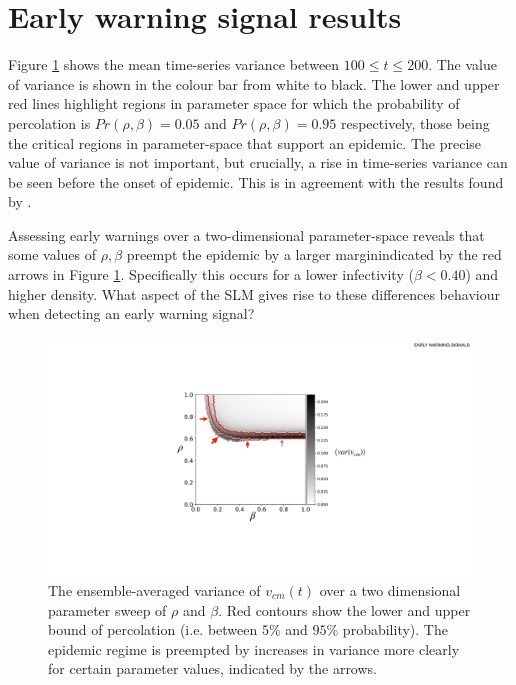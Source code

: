 \section{Early warning signal results}
\label{section:ews_slm}

Figure \ref{fig:ews-results} shows the mean time-series variance between $100\leq t \leq 200$. %
The value of variance is shown in the colour bar from white to black. %
The lower and upper red lines highlight regions in parameter space for which the %
probability of percolation is $Pr(\rho, \beta)=0.05$ and $Pr(\rho, \beta)=0.95$ respectively, %
those being the  critical regions in parameter-space that support an epidemic. %
The precise value of variance is not important, but crucially, a rise in time-series variance %
can be seen before the onset of epidemic. %
This is in agreement with the results found by \cite{OROZCOFUENTES201912}. %

Assessing early warnings over a two-dimensional parameter-space reveals that some values %
of $\rho, \beta$ preempt the epidemic by a larger margin\textemdash indicated by the red %
arrows in Figure \ref{fig:ews-results}. Specifically this occurs for a lower infectivity %
($\beta<0.40$) and higher density. What aspect of the SLM gives rise to these differences %
behaviour when detecting an early warning signal? %

 \begin{figure}
    \centering
    \includegraphics[scale=0.45]{chapter3/figures/figure11.pdf}
    \caption{The ensemble-averaged variance of $v_{cm}(t)$ over a two dimensional parameter sweep of $\rho$ and $\beta$. Red contours show the lower and upper bound of percolation (i.e. between $5\%$ and $95\%$ probability). 
     The epidemic regime is preempted by increases in variance more clearly for certain parameter values, %
     indicated by the arrows.}
    \label{fig:ews-results} 
\end{figure}


